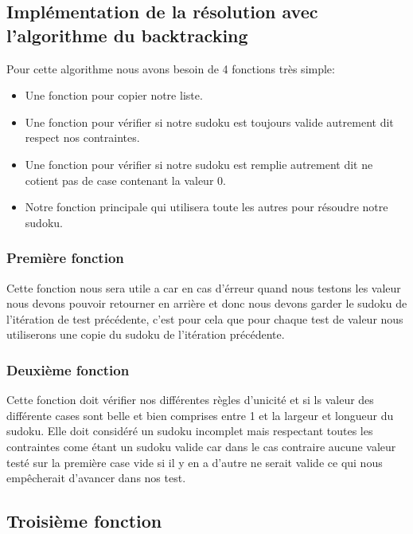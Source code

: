 \subsection{Implémentation de la résolution avec l'algorithme du backtracking}

Pour cette algorithme nous avons besoin de 4 fonctions très simple:

\begin{itemize}
  \item Une fonction pour copier notre liste.
  \item Une fonction pour vérifier si notre sudoku est toujours valide autrement dit respect nos contraintes.
  \item Une fonction pour vérifier si notre sudoku est remplie autrement dit ne cotient pas de case contenant la valeur 0.
  \item Notre fonction principale qui utilisera toute les autres pour résoudre notre sudoku.
\end{itemize}

\subsubsection{Première fonction}

Cette fonction nous sera utile a car en cas d'érreur quand nous testons les valeur nous devons pouvoir retourner en arrière et donc nous devons garder le sudoku de l'itération de test précédente, c'est pour cela que pour chaque test de valeur nous utiliserons une copie du sudoku de l'itération précédente.\newline

\subsubsection{Deuxième fonction}

Cette fonction doit vérifier nos différentes règles d'unicité et si ls valeur des différente cases sont belle et bien comprises entre 1 et la largeur et longueur du sudoku. Elle doit considéré un sudoku incomplet mais respectant toutes les contraintes come étant un sudoku valide car dans le cas contraire aucune valeur testé sur la première case vide si il y en a d'autre ne serait valide ce qui nous empêcherait d'avancer dans nos test.\newline

\subsection{Troisième fonction}

